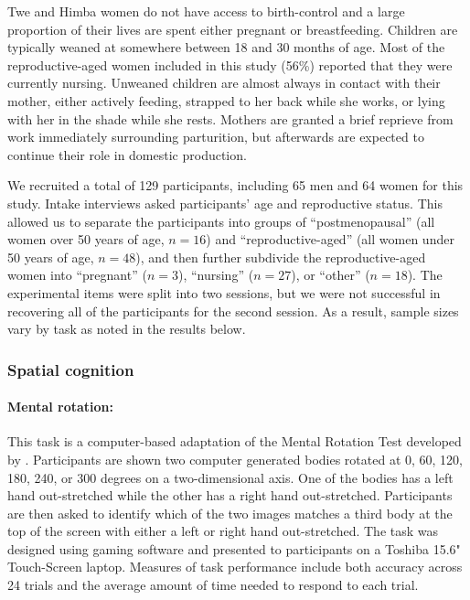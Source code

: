 Twe and Himba women do not have access to birth-control and a large proportion of their lives are spent either pregnant or breastfeeding.  Children are typically weaned at somewhere between 18 and 30 months of age.  Most of the reproductive-aged women included in this study (56\%) reported that they were currently nursing.  Unweaned children are almost always in contact with their mother, either actively feeding, strapped to her back while she works, or lying with her in the shade while she rests.  Mothers are granted a brief reprieve from work immediately surrounding parturition, but afterwards are expected to continue their role in domestic production.

We recruited a total of 129 participants, including 65 men and 64 women for this study.  Intake interviews asked participants' age and reproductive status.  This allowed us to separate the participants into groups of ``postmenopausal'' (all women over 50 years of age, $n = 16$) and ``reproductive-aged'' (all women under 50 years of age, $n = 48$), and then further subdivide the reproductive-aged women into ``pregnant'' ($n = 3$), ``nursing'' ($n = 27$), or ``other'' ($n = 18$).  The experimental items were split into two sessions, but we were not successful in recovering all of the participants for the second session.  As a result, sample sizes vary by task as noted in the results below.

		\subsubsection{Spatial cognition}
		\label{sec:2.2.1}		
\paragraph{Mental rotation:}  This task is a computer-based adaptation of the Mental Rotation Test developed by \citet{shepard1971mental}.  Participants are shown two computer generated bodies rotated at 0, 60, 120, 180, 240, or 300 degrees on a two-dimensional axis.  One of the bodies has a left hand out-stretched while the other has a right hand out-stretched.  Participants are then asked to identify which of the two images matches a third body at the top of the screen with either a left or right hand out-stretched.  The task was designed using gaming software \citep{unity14} and presented to participants on a Toshiba 15.6" Touch-Screen laptop.  Measures of task performance include both accuracy across 24 trials and the average amount of time needed to respond to each trial.


